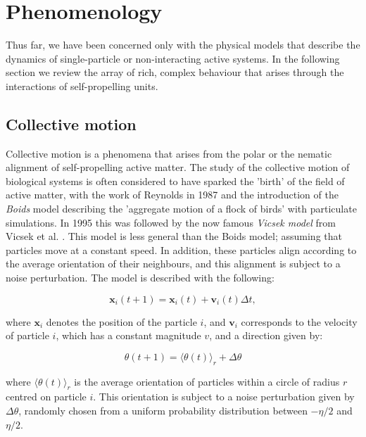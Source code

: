 \section{Phenomenology}
\label{section:activeMatter:phenom}



Thus far, we have been concerned only with the physical models that describe the dynamics of single-particle or non-interacting active systems. In the following section we review the array of rich, complex behaviour that arises through the interactions of self-propelling units. 


\subsection{Collective motion}
\label{section:activeMatter:CollectiveMotion}


Collective motion is a phenomena that arises from the polar or the nematic alignment of self-propelling active matter. The study of the collective motion of biological systems is often considered to have sparked the 'birth' of the field of active matter, with the work of Reynolds in 1987 \cite{reynolds1987} and the introduction of the \textit{Boids} model describing the 'aggregate motion of a flock of birds' with particulate simulations. In 1995 this was followed by the now famous \textit{Vicsek model} from Vicsek et al. \cite{vicsek1995}. This model is less general than the Boids model; assuming that particles move at a constant speed. In addition, these particles align according to the average orientation of their neighbours, and this alignment is subject to a noise perturbation. The model is described with the following:

\begin{equation}
	\mathbf{x}_{i}(t+1)=\mathbf{x}_{i}(t)+\mathbf{v}_{i}(t) \Delta t,
\end{equation} 

\noindent where $\mathbf{x}_i$ denotes the position of the particle $i$, and $\mathbf{v}_i$ corresponds to the velocity of particle $i$, which has a constant magnitude $v$, and a direction given by:


\begin{equation}
	\theta(t+1)=\langle\theta(t)\rangle_{r}+\Delta \theta
\end{equation}

\noindent where $\langle\theta(t)\rangle_{r}$ is the average orientation of particles within a circle of radius $r$ centred on particle $i$. This orientation is subject to a noise perturbation given by $\Delta \theta$, randomly chosen from a uniform probability distribution between $-\eta/2$ and $\eta/2$. 

